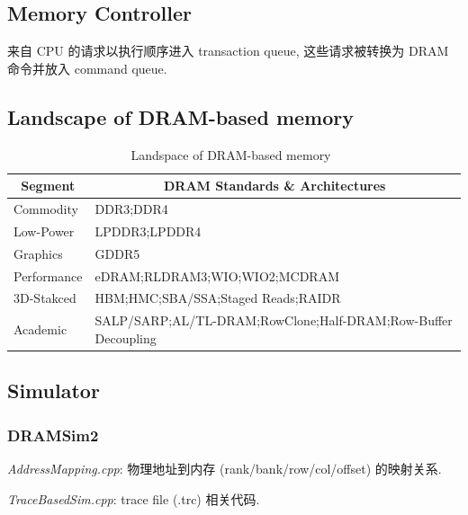 \documentclass[UTF8,12pt,a4paper]{article}
\begin{document}
\subsection{Memory Controller}
来自 CPU 的请求以执行顺序进入 transaction queue,
这些请求被转换为 DRAM 命令并放入 command queue.

\subsection{Landscape of DRAM-based memory}
\begin{table}
  \begin{small}
    \caption{Landspace of DRAM-based memory~\cite{DBLP:journals/cal/KimYM16}}
    \label{tab:memory_landscape}
    \begin{center}
      \begin{tabular}[c]{l|l}
        \hline
        \multicolumn{1}{c|}{\textbf{Segment}} & 
        \multicolumn{1}{c}{\textbf{DRAM Standards \& Architectures}} \\
        \hline
        Commodity & DDR3;DDR4 \\
        Low-Power & LPDDR3;LPDDR4 \\
        Graphics & GDDR5 \\
        Performance & eDRAM;RLDRAM3;WIO;WIO2;MCDRAM \\
        3D-Stakced & HBM;HMC;SBA/SSA;Staged Reads;RAIDR \\
        Academic & SALP/SARP;AL/TL-DRAM;RowClone;Half-DRAM;Row-Buffer Decoupling \\
        \hline
      \end{tabular}
    \end{center}
  \end{small}
\end{table}

\subsection{Simulator}
\subsubsection{DRAMSim2}
\begin{compactitem}
  \item \textit{AddressMapping.cpp}: 物理地址到内存 (rank/bank/row/col/offset) 的映射关系.
  \item \textit{TraceBasedSim.cpp}: trace file (.trc) 相关代码.
\end{compactitem}
\end{document}
